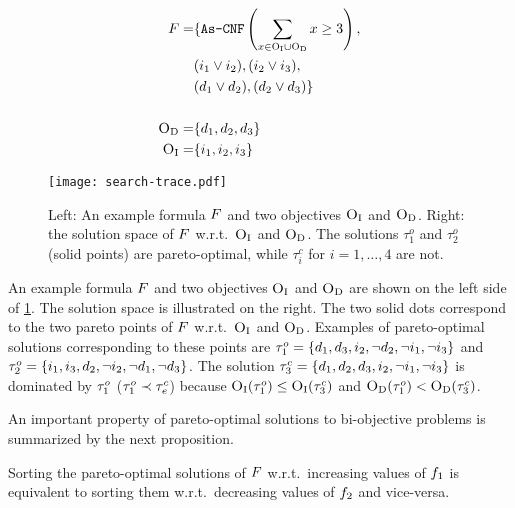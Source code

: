 \begin{figure}
  \begin{minipage}{0.36\textwidth}
  \footnotesize
  \begin{align*}
  F = &\{ \texttt{As-CNF}\left(\sum_ {x \in \textsc{O}_{\text{I}} \cup \textsc{O}_{\text{D}}} x \geq 3 \right), \\
  			&(i_1 \lor i_2),  (i_2 \lor i_3), \\
		 &(d_1 \lor d_2), (d_2 \lor d_3) \} \\ \\
  \textsc{O}_{\text{D}} =&\{ d_1,d_2, d_3\}   \\ 
  \textsc{O}_{\text{I}} =&\{ i_1,i_2, i_3\}  
  \end{align*}
  \end{minipage}
  \;
  \begin{minipage}{0.6\textwidth}
    \texttt{[image: search-trace.pdf]}
  \end{minipage}
  \caption{Left: An example formula $F$ and two objectives $\textsc{O}_{\text{I}}$ and $\textsc{O}_{\text{D}}$.
    Right: the solution space of $F$ w.r.t.\ $\textsc{O}_{\text{I}}$ and $\textsc{O}_{\text{D}}$.
    The solutions $\tau^o_1$ and $\tau^o_2$ (solid points) are pareto-optimal, while $\tau^c_i$ for $i=1,\ldots,4$ are not.\label{fig:search-trace}}
\end{figure}
\begin{example}\label{ex:main}
  An example formula $F$ and two objectives $\textsc{O}_{\text{I}}$ and $\textsc{O}_{\text{D}}$ are shown on the left side of \cref{fig:search-trace}. 
  The solution space is illustrated on the right.
  The two solid dots correspond to the two pareto points of $F$ w.r.t.\ $\textsc{O}_{\text{I}}$ and $\textsc{O}_{\text{D}}$. 
  Examples of pareto-optimal solutions corresponding to these points are $\tau^o_1 = \{d_1, d_3, i_2, \lnot d_2, \lnot i_1, \lnot i_3\}$ and $\tau^o_2 = \{i_1, i_3, d_2, \lnot i_2, \lnot d_1, \lnot d_3\}$.
  The solution $\tau^c_3 = \{d_1, d_2, d_3, i_2, \lnot i_1, \lnot i_3\}$ is dominated by $\tau^o_1$ ($\tau^o_1 \prec \tau^c_e$) because $\textsc{O}_{\text{I}}(\tau^o_1) \leq \textsc{O}_{\text{I}}(\tau^c_3)$ and $\textsc{O}_{\text{D}}(\tau^o_1) < \textsc{O}_{\text{D}}(\tau^c_3)$.
\end{example}

An important property of pareto-optimal solutions to bi-objective problems is summarized by the next proposition.
\begin{proposition} \label{prop:biobjective}
  Sorting the pareto-optimal solutions of $F$ w.r.t.\ increasing values of $f_1$ is equivalent to sorting them w.r.t.\ decreasing values of $f_2$ and vice-versa.
\end{proposition}

